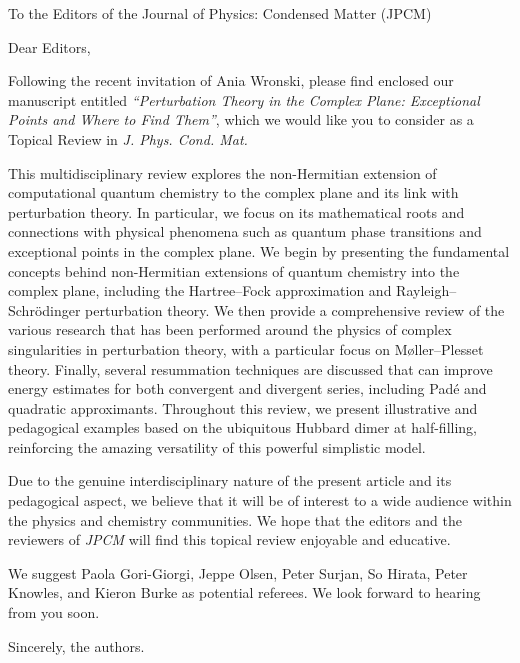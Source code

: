 \documentclass[10pt]{letter}
\begin{document}
\begin{letter}%
{To the Editors of the Journal of Physics: Condensed Matter (JPCM)}

\opening{Dear Editors,}

\justifying
Following the recent invitation of Ania Wronski, please find enclosed our manuscript entitled \textit{``Perturbation Theory in the Complex Plane: Exceptional Points and Where to Find Them''}, which we would like you to consider as a Topical Review in \textit{J. Phys. Cond. Mat.}

This multidisciplinary review explores the non-Hermitian extension of computational quantum chemistry to the complex plane and its link with perturbation theory.
In particular, we focus on its mathematical roots and connections with physical phenomena such as quantum phase transitions and exceptional points in the complex plane.
We begin by presenting the fundamental concepts behind non-Hermitian extensions of quantum chemistry into the complex plane, including the Hartree--Fock approximation and
Rayleigh--Schr\"odinger perturbation theory. 
We then provide a comprehensive review of the various research that has been performed around the physics of complex singularities in perturbation theory, with a particular focus on M{\o}ller--Plesset theory.
Finally, several resummation techniques are discussed that can improve energy estimates for both convergent and divergent series, including Pad\'e and quadratic approximants.
Throughout this review, we present illustrative and pedagogical examples based on the ubiquitous Hubbard dimer at half-filling, reinforcing the amazing versatility of this powerful simplistic model.

Due to the genuine interdisciplinary nature of the present article and its pedagogical aspect, we believe that it will be of interest to a wide audience within the physics and chemistry communities.
We hope that the editors and the reviewers of \textit{JPCM} will find this topical review enjoyable and educative.

We suggest Paola Gori-Giorgi, Jeppe Olsen, Peter Surjan, So Hirata, Peter Knowles, and Kieron Burke as potential referees.
We look forward to hearing from you soon.

\closing{Sincerely, the authors.}


\end{letter}
\end{document}
